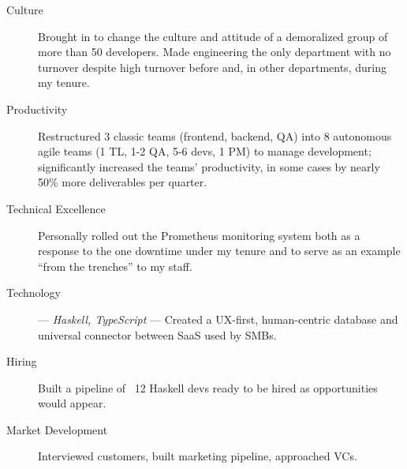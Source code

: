 \vspace{4 mm}

\begin{langen}
\begin{description}%
\item[Culture] Brought in to change the culture and attitude of a demoralized group of more than 50 developers. Made engineering the only department with no turnover despite high turnover before and, in other departments, during my tenure.
\item[Productivity] Restructured 3 classic teams (frontend, backend, QA) into 8 autonomous agile teams (1 TL, 1-2 QA, 5-6 devs, 1 PM) to manage development; significantly increased the teams' productivity, in some cases by nearly 50\% more deliverables per quarter.
\item[Technical Excellence] Personally rolled out the Prometheus monitoring system both as a response to the one downtime under my tenure and to serve as an example ``from the trenches'' to my staff.
\end{description}
\end{langen}

\vspace{4 mm}

\begin{langen}
\begin{description}%
\item[Technology] --- \textit{Haskell, TypeScript} --- Created a UX-first, human-centric database and universal connector between SaaS used by SMBs.
\item[Hiring] Built a pipeline of ~12 Haskell devs ready to be hired as opportunities would appear.
\item[Market Development] Interviewed customers, built marketing pipeline, approached VCs.
\end{description}
\end{langen}

\pagebreak

